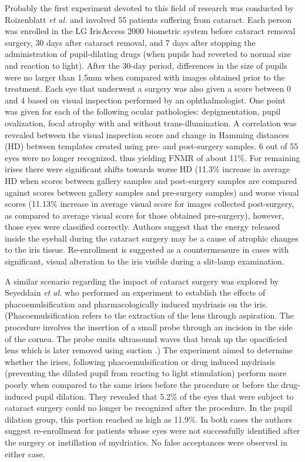\documentclass[article,12pt]{elsarticle}
\begin{document}
Probably the first experiment devoted to this field of research was conducted by Roizenblatt \emph{et al.} \cite{Roizenblatt} and involved 55 patients suffering from cataract. Each person was enrolled in the LG IrisAccess 2000 biometric system before cataract removal surgery, 30 days after cataract removal, and 7 days after stopping the administration of pupil-dilating drugs (when pupils had reverted to normal size and reaction to light). After the 30-day period, differences in the size of pupils  were no larger than 1.5mm when compared with images obtained prior to the treatment. Each eye that underwent a surgery was also given a score between 0 and 4 based on visual inspection performed by an ophthalmologist. One point was given for each of the following ocular pathologies: depigmentation, pupil ovalization, focal atrophy with and without trans-illumination. A correlation was revealed between the visual inspection score and change in Hamming distances (HD) between templates created using pre- and post-surgery samples. 6 out of 55 eyes were no longer recognized, thus yielding FNMR of about 11\%. For remaining irises there were significant shifts towards worse HD (11.3\% increase in average HD when scores between gallery samples and post-surgery samples are compared against scores between gallery samples and pre-surgery samples) and worse visual scores (11.13\% increase in average visual score for images collected post-surgery, as compared to average visual score for those obtained pre-surgery), however, those eyes were classified correctly. Authors suggest that the energy released inside the eyeball during the cataract surgery may be a cause of atrophic changes to the iris tissue. Re-enrollment is suggested as a countermeasure in cases with significant, visual alteration to the iris visible during a slit-lamp examination.

A similar scenario regarding the impact of cataract surgery was explored by Seyeddain \emph{et al.} \cite{Seyeddain2014} who performed an experiment to establish the effects of phacoemulsification and pharmacologically induced mydriasis on the iris. (Phacoemulsification refers to the extraction of the lens through aspiration. The procedure involves the insertion of a small probe through an incision in the side of the cornea. The probe emits ultrasound waves that break up the opacificied lens which is later removed using suction \cite{TrokielewiczWilga2014}.) The experiment aimed to determine whether the irises, following phacoemulsification or drug induced mydriasis (preventing the dilated pupil from reacting to light stimulation) perform more poorly when compared to the same irises before the procedure or before the drug-induced pupil dilation. They revealed that 5.2\% of the eyes that were subject to cataract surgery could no longer be recognized after the procedure. In the pupil dilation group, this portion reached as high as 11.9\%. In both cases the authors suggest re-enrollment for patients whose eyes were not successfully identified after the surgery or instillation of mydriatics. No false acceptances were observed in either case.
\end{document}
